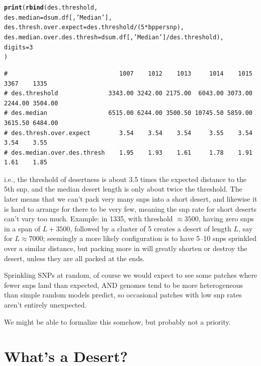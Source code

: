 \documentclass{article}\usepackage[]{graphicx}\usepackage[]{color}
\makeatletter
\newcommand{\hlnum}[1]{\textcolor[rgb]{0.686,0.059,0.569}{#1}}%
\newcommand{\hlstr}[1]{\textcolor[rgb]{0.192,0.494,0.8}{#1}}%
\newcommand{\hlopt}[1]{\textcolor[rgb]{0,0,0}{#1}}%
\newcommand{\hlstd}[1]{\textcolor[rgb]{0.345,0.345,0.345}{#1}}%
\newcommand{\hlkwc}[1]{\textcolor[rgb]{0.333,0.667,0.333}{#1}}%
\newcommand{\hlkwd}[1]{\textcolor[rgb]{0.737,0.353,0.396}{\textbf{#1}}}%
\newenvironment{kframe}{%
 \def\at@end@of@kframe{}%
 \ifinner\ifhmode%
  \def\at@end@of@kframe{\end{minipage}}%
  \begin{minipage}{\columnwidth}%
 \fi\fi%
 \def\FrameCommand##1{\hskip\@totalleftmargin \hskip-\fboxsep
 \colorbox{shadecolor}{##1}\hskip-\fboxsep
     \hskip-\linewidth \hskip-\@totalleftmargin \hskip\columnwidth}%
 \MakeFramed {\advance\hsize-\width
   \@totalleftmargin\z@ \linewidth\hsize
   \@setminipage}}%
 {\par\unskip\endMakeFramed%
 \at@end@of@kframe}
\newenvironment{knitrout}{}{} %
\makeatother
\begin{document}
\begin{knitrout}\footnotesize
{}\color{fgcolor}\begin{kframe}
\begin{alltt}
\hlkwd{print}\hlstd{(}\hlkwd{rbind}\hlstd{(des.threshold,}
            \hlkwc{des.median}\hlstd{=dsum.df[,}\hlstr{'Median'}\hlstd{],}
            \hlkwc{des.thresh.over.expect}\hlstd{=des.threshold}\hlopt{/}\hlstd{(}\hlnum{5}\hlopt{*}\hlstd{bppersnp),}
            \hlkwc{des.median.over.des.thresh}\hlstd{=dsum.df[,}\hlstr{'Median'}\hlstd{]}\hlopt{/}\hlstd{des.threshold),}
      \hlkwc{digits}\hlstd{=}\hlnum{3}
\hlstd{)}
\end{alltt}
\begin{verbatim}
#                               1007    1012    1013     1014    1015    3367    1335
# des.threshold              3343.00 3242.00 2175.00  6043.00 3073.00 2244.00 3504.00
# des.median                 6515.00 6244.00 3500.50 10745.50 5859.00 3615.50 6484.00
# des.thresh.over.expect        3.54    3.54    3.54     3.55    3.54    3.54    3.55
# des.median.over.des.thresh    1.95    1.93    1.61     1.78    1.91    1.61    1.85
\end{verbatim}
\end{kframe}
\end{knitrout}

\noindent i.e., the threshold of desertness is about 3.5 times the expected distance to the 5th snp, and the median desert length is only about twice the threshold.  The later means that we can't pack very many snps into a short desert, and likewise it is hard to arrange for there to be very few, meaning the snp rate for short deserts can't vary too much.  Example: in 1335, with threshold $\approx 3500$, having zero snps in a span of $L+3500$, followed by a cluster of 5 creates a desert of length $L$, say for $L\approx7000$;  seemingly a more likely configuration is to have 5--10 snps sprinkled over a similar distance, but packing more in will greatly shorten or destroy the desert, unless they are all packed at the ends. 

Sprinkling SNPs at random, of course we would expect to see some patches where fewer snps land than expected, AND genomes tend to be more heterogeneous than simple random models predict, so occasional patches with low snp rates aren't entirely unexpected.

We might be able to formalize this somehow, but probably not a priority.

\section{What's a Desert?}
\label{sec:desert-definition}
\end{document}
